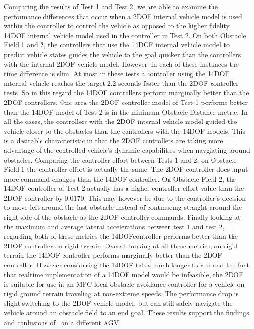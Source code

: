 \documentclass[12pt,twocolumn]{article}
\newcommand{\CHRONO}{{\sffamily{{Chrono}}}}
\begin{document}
Comparing the results of Test 1 and Test 2, we are able to examine the performance differences that occur when a 2DOF internal vehicle model is used within the controller to control the {\CHRONO} vehicle as opposed to the higher fidelity 14DOF internal vehicle model used in the controller in Test 2. On both Obstacle Field 1 and 2, the controllers that use the 14DOF internal vehicle model to predict vehicle states guides the {\CHRONO} vehicle to the goal quicker than the controllers with the internal 2DOF vehicle model. However, in each of these instances the time difference is slim. At most in these tests a controller using the 14DOF internal vehicle reaches the target 2.2 seconds faster than the 2DOF controller tests. So in this regard the 14DOF controllers perform marginally better than the 2DOF controllers. One area the 2DOF controller model of Test 1 performs better than the 14DOF model of Test 2 is in the minimum Obstacle Distance
metric. In all the cases, the controllers with the 2DOF internal vehicle model guided the vehicle closer to the obstacles than the controllers with the 14DOF models. This is a desirable characteristic in that the 2DOF controllers are taking more advantage of the controlled vehicle's dynamic capabilities when navgiating around obstacles. Comparing the controller effort between Tests 1 and 2, on Obstacle Field 1 the controller effort is actually the same. The 2DOF controller does input more command changes than the 14DOF controller. On Obstacle Field 2, the 14DOF controller of Test 2 actually has a higher controller effort value than the 2DOF controller by 0.0170. This may however be due to the controller's decision to move left around the last obstacle instead of continueing straight around the right side of the obstacle as the 2DOF controller commands. Finally looking at the maximum and average lateral accelerations between test 1 and test 2, regarding both of these metrics  the 14DOFcontroller performs better than the 2DOF controller on rigid terrain. Overall looking at all these metrics, on rigid terrain the 14DOF controller performs marginally better than the 2DOF controller. However considering the 14DOF takes much longer to run and the fact that realtime implementation of a 14DOF model would be infeasible, the 2DOF is suitable for use in an MPC local obstacle avoidance controller for a vehicle on rigid ground terrain traveling at non-extreme speeds. The performance drop is slight switching to the 2DOF vehicle model, but can still safely navigate the vehicle around an obstacle field to an end goal. These results support the findings and conlusions of~\cite{ModelFidelity2016} on a different AGV. 
\end{document}
